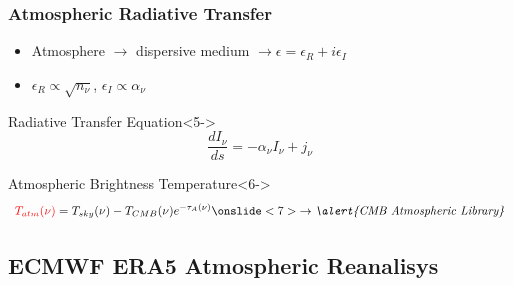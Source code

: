 \documentclass[10pt,aspectratio=169]{beamer}
\begin{document}
\begin{frame}[label=1]
\frametitle{Atmospheric Radiative Transfer}

\begin{itemize}
\item<1-3,5-> Atmosphere $\rightarrow$ \alert{dispersive} medium $\rightarrow \epsilon = \epsilon_R + i\epsilon_I$
\item<2-3,5-> $\epsilon_R \propto \sqrt{n_\nu}$,
          \quad $\epsilon_I \propto \alpha_\nu$ 
\end{itemize}


\begin{block}{Radiative Transfer Equation}<5->
\begin{equation}
\frac{dI_\nu}{ds} = -\alpha_\nu I_\nu + j_\nu
\end{equation}
\end{block}

\begin{block}{Atmospheric Brightness Temperature}<6->%
\begin{equation}
\textcolor{red}{T_{atm}(\nu)} = T_{sky}(\nu) - T_{CMB}(\nu)e^{-\tau_A(\nu)}%
\onslide<7>{\rightarrow \textit{\alert{CMB Atmospheric Library}}}%
\end{equation}%
\end{block}%

\end{frame}

\subsection{ECMWF ERA5 Atmospheric Reanalisys}
\end{document}
